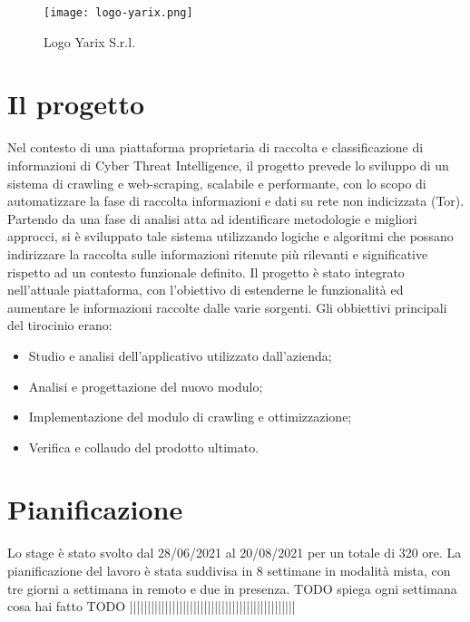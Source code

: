 \begin{figure}[!h] 
    \centering 
    \texttt{[image: logo-yarix.png]} 
    \caption{Logo Yarix S.r.l.}
\end{figure}

\section{Il progetto}

Nel contesto di una piattaforma proprietaria di raccolta e classificazione di informazioni di Cyber Threat Intelligence, il progetto prevede lo sviluppo di un sistema di crawling e web-scraping, scalabile e performante, con lo scopo di automatizzare la fase di raccolta informazioni e dati su rete non indicizzata (Tor). Partendo da una fase di analisi atta ad identificare metodologie e migliori approcci, si è sviluppato tale sistema utilizzando logiche e algoritmi che possano indirizzare la raccolta sulle informazioni ritenute più rilevanti e significative rispetto ad un contesto funzionale definito.\newline{}
Il progetto è stato integrato nell'attuale piattaforma, con l'obiettivo di estenderne le funzionalità ed aumentare le informazioni raccolte dalle varie sorgenti.\newline{} Gli obbiettivi principali del tirocinio erano: \newline{}
\begin{itemize}
	\item Studio e analisi dell'applicativo utilizzato dall’azienda;
	\item Analisi e progettazione del nuovo modulo;
	\item Implementazione del modulo di crawling e ottimizzazione;
	\item Verifica e collaudo del prodotto ultimato.
\end{itemize}
\section{Pianificazione}
Lo stage è stato svolto dal 28/06/2021 al 20/08/2021 per un totale di 320 ore. La pianificazione del lavoro è stata suddivisa in 8 settimane in modalità mista, con tre giorni a settimana in remoto e due in presenza.
TODO spiega ogni settimana cosa hai fatto TODO |||||||||||||||||||||||||||||||||||||||||||||||


